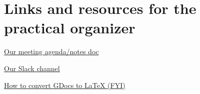 \documentclass{article}
\begin{document}
\newpage

\section{Links and resources for the practical organizer}


\href{https://docs.google.com/document/d/1XMhbWeMdVgvgZoUz4VCezFH5bnMrgQWkQ1Zt4rR_wwE/edit}{Our meeting agenda/notes doc}

\href{https://comp354pk-b.slack.com/}{Our Slack channel}

\href{https://tex.stackexchange.com/questions/183358/how-to-convert-a-google-docs-document-to-latex}{How to convert GDocs to LaTeX (FYI)}
\end{document}
